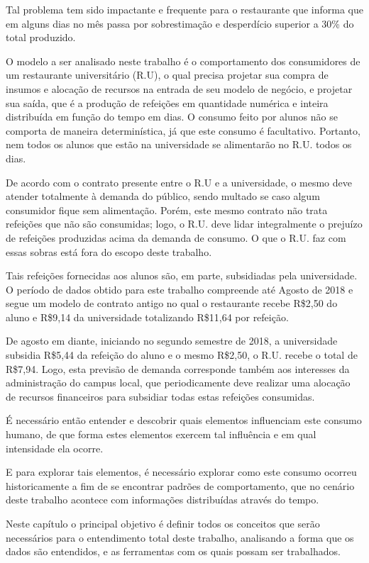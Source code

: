 \documentclass[	12pt, Times, openright, twoside, a4paper, english, brazil]{abntex2}
\begin{document}
        Tal problema tem sido impactante e frequente para o restaurante que informa que em alguns
        dias no mês passa por sobrestimação e desperdício superior a 30\% do total produzido.

        O modelo a ser analisado neste trabalho é o comportamento dos consumidores de um restaurante universitário (R.U), o qual precisa projetar sua compra de insumos e alocação de recursos na entrada de seu modelo de negócio, e projetar sua saída, que é a produção de refeições em quantidade numérica e inteira distribuída em função do tempo em dias. O consumo feito por alunos não se comporta de maneira determinística, já que este consumo é facultativo. Portanto, nem todos os alunos que estão na universidade se alimentarão no R.U. todos os dias.

        De acordo com o contrato presente entre o R.U e a universidade, o mesmo deve atender totalmente à demanda do público, sendo multado se caso algum consumidor fique sem alimentação. Porém, este mesmo contrato não trata refeições que não são consumidas; logo, o R.U. deve lidar integralmente o prejuízo de refeições produzidas acima da demanda de consumo. O que o R.U. faz com essas sobras está fora do escopo deste trabalho.

        Tais refeições fornecidas aos alunos são, em parte, subsidiadas pela universidade. O período de dados obtido para este trabalho compreende até Agosto de 2018 e segue um modelo de contrato antigo no qual o restaurante recebe R\$2,50 do aluno e R\$9,14 da universidade totalizando R\$11,64 por refeição.

        De agosto em diante, iniciando no segundo semestre de 2018, a universidade subsidia R\$5,44 da refeição do aluno e o mesmo R\$2,50, o R.U. recebe o total de R\$7,94. Logo, esta previsão de demanda corresponde também aos interesses da administração do campus local, que periodicamente deve realizar uma alocação de recursos financeiros para subsidiar todas estas refeições consumidas.

        É necessário então entender e descobrir quais elementos influenciam este consumo humano, de que forma estes elementos exercem tal influência e em qual intensidade ela ocorre.

        E para explorar tais elementos, é necessário explorar como este consumo ocorreu historicamente a fim de se encontrar padrões de comportamento, que no cenário deste trabalho acontece com informações distribuídas através do tempo. 

        Neste capítulo o principal objetivo é definir todos os conceitos que serão necessários para o entendimento total deste trabalho, analisando a forma que os dados são entendidos, e as ferramentas com os quais possam ser trabalhados.        
\end{document}

